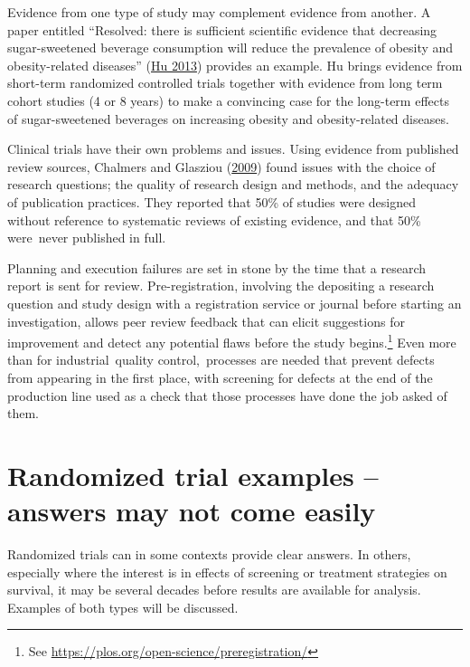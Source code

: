 \documentclass[
  10pt,
  b5paper]{book}
\begin{document}
Evidence from one type of study may complement evidence from another. A
paper entitled ``Resolved: there is sufficient scientific evidence that
decreasing sugar-sweetened beverage consumption will reduce the
prevalence of obesity and obesity-related diseases'' (\protect\hyperlink{ref-hu2013resolved}{Hu 2013})
provides an example. Hu brings evidence from short-term randomized
controlled trials together with evidence from long term cohort studies
(4 or 8 years) to make a convincing case for the long-term effects of
sugar-sweetened beverages on increasing obesity and obesity-related
diseases.

Clinical trials have their own problems and issues. Using evidence from
published review sources, Chalmers and Glasziou (\protect\hyperlink{ref-chalmers2009avoidable}{2009}) found issues with the
choice of research questions; the quality of research design and
methods, and the adequacy of publication practices. They reported that
50\% of studies were designed without reference to systematic reviews of
existing evidence, and that 50\% were~never published in full.

Planning and execution failures are set in stone by the time that a
research report is sent for review. Pre-registration, involving the
depositing a research question and study design with a registration
service or journal before starting an investigation, allows peer review
feedback that can elicit suggestions for improvement and detect any
potential flaws before the study begins.\footnote{See \url{https://plos.org/open-science/preregistration/}} Even more than
for industrial~quality control,~processes are needed that prevent
defects from appearing in the first place, with screening for defects at
the end of the production line used as a check that those processes have
done the job asked of them.

\hypertarget{randomized-trial-examples-answers-may-not-come-easily}{%
\section{Randomized trial examples -- answers may not come easily}\label{randomized-trial-examples-answers-may-not-come-easily}}

Randomized trials can in some contexts provide clear answers.
In others, especially where the interest is in effects of
screening or treatment strategies on survival, it may be
several decades before results are available for analysis.
Examples of both types will be discussed.
\end{document}
